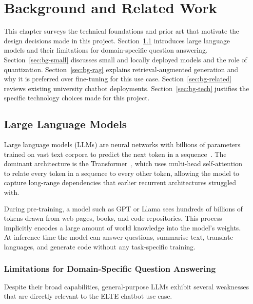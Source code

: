 \chapter{Background and Related Work}
\label{ch:background}

This chapter surveys the technical foundations and prior art that motivate the design decisions made in this project. Section~\ref{sec:bg-llm} introduces large language models and their limitations for domain-specific question answering. Section~\ref{sec:bg-small} discusses small and locally deployed models and the role of quantization. Section~\ref{sec:bg-rag} explains retrieval-augmented generation and why it is preferred over fine-tuning for this use case. Section~\ref{sec:bg-related} reviews existing university chatbot deployments. Section~\ref{sec:bg-tech} justifies the specific technology choices made for this project.

\section{Large Language Models}
\label{sec:bg-llm}

Large language models (LLMs) are neural networks with billions of parameters trained on vast text corpora to predict the next token in a sequence~\cite{brown2020gpt3}. The dominant architecture is the Transformer~\cite{vaswani2017attention}, which uses multi-head self-attention to relate every token in a sequence to every other token, allowing the model to capture long-range dependencies that earlier recurrent architectures struggled with.

During pre-training, a model such as GPT or Llama sees hundreds of billions of tokens drawn from web pages, books, and code repositories. This process implicitly encodes a large amount of world knowledge into the model's weights. At inference time the model can answer questions, summarise text, translate languages, and generate code without any task-specific training.

\subsection{Limitations for Domain-Specific Question Answering}

Despite their broad capabilities, general-purpose LLMs exhibit several weaknesses that are directly relevant to the ELTE chatbot use case.


